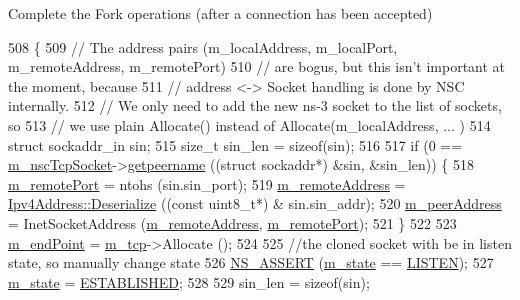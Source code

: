 Complete the Fork operations (after a connection has been accepted) 


\begin{DoxyCode}
508 \{
509   \textcolor{comment}{// The address pairs (m\_localAddress, m\_localPort, m\_remoteAddress, m\_remotePort)}
510   \textcolor{comment}{// are bogus, but this isn't important at the moment, because}
511   \textcolor{comment}{// address <-> Socket handling is done by NSC internally.}
512   \textcolor{comment}{// We only need to add the new ns-3 socket to the list of sockets, so}
513   \textcolor{comment}{// we use plain Allocate() instead of Allocate(m\_localAddress, ... )}
514   \textcolor{keyword}{struct }sockaddr\_in sin;
515   \textcolor{keywordtype}{size\_t} sin\_len = \textcolor{keyword}{sizeof}(sin);
516 
517   \textcolor{keywordflow}{if} (0 == \hyperlink{classns3_1_1NscTcpSocketImpl_a540a25a7e3ea5777872b16662da3e616}{m\_nscTcpSocket}->\hyperlink{structINetStreamSocket_aa24057febafbd91c96504e108ae7fabf}{getpeername} ((\textcolor{keyword}{struct} sockaddr*) &sin, &sin\_len)) \{
518       \hyperlink{classns3_1_1NscTcpSocketImpl_ad0094ba92f10c47bc783acf5c15026b7}{m\_remotePort} = ntohs (sin.sin\_port);
519       \hyperlink{classns3_1_1NscTcpSocketImpl_aa61f63cf0fa0e3fe3e02a5a90224caf9}{m\_remoteAddress} = \hyperlink{classns3_1_1Ipv4Address_ac6e205258d95465ce51c148e51590760}{Ipv4Address::Deserialize} ((\textcolor{keyword}{const} uint8\_t*) &
      sin.sin\_addr);
520       \hyperlink{classns3_1_1NscTcpSocketImpl_aa40744cb48bdd7d29b375ede7b736978}{m\_peerAddress} = InetSocketAddress (\hyperlink{classns3_1_1NscTcpSocketImpl_aa61f63cf0fa0e3fe3e02a5a90224caf9}{m\_remoteAddress}, 
      \hyperlink{classns3_1_1NscTcpSocketImpl_ad0094ba92f10c47bc783acf5c15026b7}{m\_remotePort});
521     \}
522 
523   \hyperlink{classns3_1_1NscTcpSocketImpl_a42d224bda60f7e75d28f3952f27d1a9c}{m\_endPoint} = \hyperlink{classns3_1_1NscTcpSocketImpl_adbb82752a7cb95d4f3e53f5ed17786f5}{m\_tcp}->Allocate ();
524 
525   \textcolor{comment}{//the cloned socket with be in listen state, so manually change state}
526   \hyperlink{assert_8h_a6dccdb0de9b252f60088ce281c49d052}{NS\_ASSERT} (\hyperlink{classns3_1_1NscTcpSocketImpl_aa60a97fe06f4b74ed57101a297d6216c}{m\_state} == \hyperlink{group__tcp_gga3929cdb47bdf159657fa24054aa5ca03a581d49096b20553996c0ef8aaf2712f8}{LISTEN});
527   \hyperlink{classns3_1_1NscTcpSocketImpl_aa60a97fe06f4b74ed57101a297d6216c}{m\_state} = \hyperlink{group__tcp_gga3929cdb47bdf159657fa24054aa5ca03a1826ad465d372319d1db905886de3743}{ESTABLISHED};
528 
529   sin\_len = \textcolor{keyword}{sizeof}(sin);

\end{DoxyCode}
